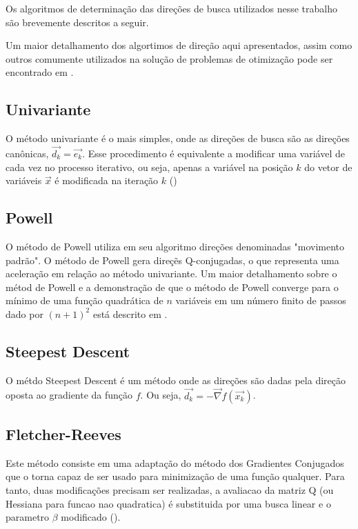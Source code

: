 \documentclass[10pt, a4paper]{article}
\begin{document}
Os algoritmos de determina\c c\~ao das dire\c c\~oes de busca utilizados nesse trabalho s\~ao brevemente descritos a seguir.

Um maior detalhamento dos algortimos de dire\c c\~ao aqui apresentados, assim como outros comumente utilizados na solu\c c\~ao de problemas de otimiza\c c\~ao pode ser encontrado em \cite{apostila}.


\subsection{Univariante}

O m\'etodo univariante \'e o mais simples, onde as dire\c c\~oes de busca s\~ao as dire\c c\~oes can\^onicas, $\vec{d_{k}}=\vec{e_{k}}$. Esse procedimento \'e equivalente a modificar uma vari\'avel de cada vez no processo iterativo, ou seja, apenas a vari\'avel na posi\c c\~ao $k$ do vetor de vari\'aveis $\vec{x}$ \'e modificada na itera\c c\~ao $k$ (\cite{apostila})
\subsection{Powell}

O m\'etodo de Powell utiliza em seu algoritmo dire\c c\~oes denominadas "movimento padr\~ao". O m\'etodo de Powell gera dire\c c\~es Q-conjugadas, o que representa uma acelera\c c\~ao em rela\c c\~ao ao m\'etodo univariante. Um maior detalhamento sobre o m\'etod de Powell e a demonstra\c c\~ao de que o m\'etodo de Powell converge para o m\'inimo de uma fun\c c\~ao quadr\'atica de $n$ vari\'aveis em um n\'umero finito de passos dado por $(n+1)^2$ est\'a descrito em \cite{apostila}.

\subsection{Steepest Descent}

O m\'etdo Steepest Descent \'e um m\'etodo onde as dire\c c\~oes s\~ao dadas pela dire\c c\~ao oposta ao gradiente da fun\c c\~ao $f$. Ou seja, $\vec{d_{k}} = -\vec{\nabla} f(\vec{x_{k}})$.

\subsection{Fletcher-Reeves}

Este m\'etodo consiste em uma adapta\c c\~ao do m\'etodo dos Gradientes Conjugados que o torna capaz de ser usado para minimiza\c c\~ao de uma fun\c c\~ao qualquer. Para tanto, duas modifica\c c\~oes precisam ser realizadas, a avaliacao da matriz Q (ou Hessiana para funcao nao quadratica) \'e substituida por uma busca linear e o parametro $\beta$ modificado (\cite{apostila}).
\end{document}
